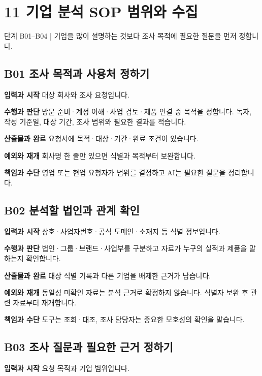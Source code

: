 \documentclass[a4paper,10pt]{article}
\begin{document}
\section*{11 기업 분석 SOP 범위와 수집}
단계 B01–B04  |  기업을 많이 설명하는 것보다 조사 목적에 필요한 질문을 먼저 정합니다.


\begingroup\setlength{\parskip}{3pt}
\subsection*{B01 조사 목적과 사용처 정하기}
\noindent\textbf{입력과 시작} 대상 회사와 조사 요청입니다.


\noindent\textbf{수행과 판단} 방문 준비·계정 이해·사업 검토·제품 연결 중 목적을 정합니다. 독자, 작성 기준일, 대상 기간, 조사 범위와 필요한 결과를 적습니다.


\noindent\textbf{산출물과 완료} 요청서에 목적·대상·기간·완료 조건이 있습니다.


\noindent\textbf{예외와 재개} 회사명 한 줄만 있으면 식별과 목적부터 보완합니다.


\noindent\textbf{책임과 수단} 영업 또는 현업 요청자가 범위를 결정하고 AI는 필요한 질문을 정리합니다.


\endgroup
\begingroup\setlength{\parskip}{3pt}
\subsection*{B02 분석할 법인과 관계 확인}
\noindent\textbf{입력과 시작} 상호·사업자번호·공식 도메인·소재지 등 식별 정보입니다.


\noindent\textbf{수행과 판단} 법인·그룹·브랜드·사업부를 구분하고 자료가 누구의 실적과 제품을 말하는지 확인합니다.


\noindent\textbf{산출물과 완료} 대상 식별 기록과 다른 기업을 배제한 근거가 남습니다.


\noindent\textbf{예외와 재개} 동일성 미확인 자료는 분석 근거로 확정하지 않습니다. 식별자 보완 후 관련 자료부터 재개합니다.


\noindent\textbf{책임과 수단} 도구는 조회·대조, 조사 담당자는 중요한 모호성의 확인을 맡습니다.


\endgroup
\begingroup\setlength{\parskip}{3pt}
\subsection*{B03 조사 질문과 필요한 근거 정하기}
\noindent\textbf{입력과 시작} 요청 목적과 기업 범위입니다.
\end{document}
